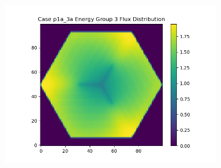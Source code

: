 \documentclass[letterpaper,11pt]{report}
\begin{document}
\begin{figure}[H]
\begin{subfigure}{.33\textwidth}
            \centering
            \includegraphics[width=1.1\linewidth]{../../phase1a/case3a/analysis_output/p1a_3a_e_eg3.png}
            \caption{}
          \end{subfigure}


\end{figure}
\end{document}
